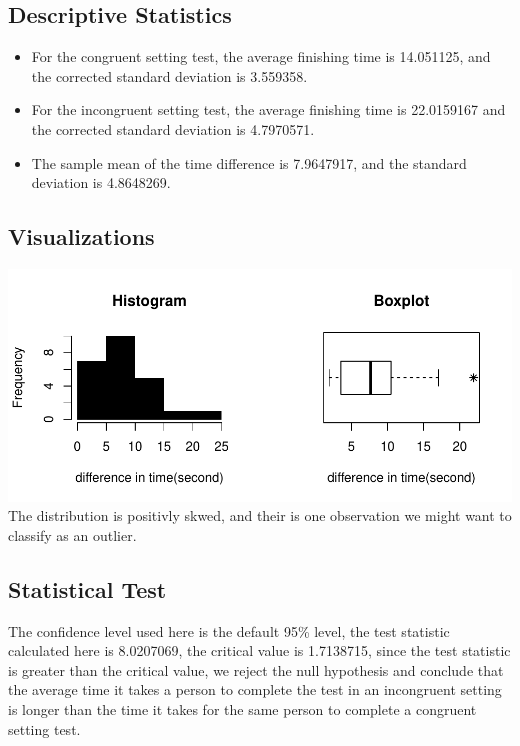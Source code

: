 \documentclass[]{article}
\begin{document}
\subsection{Descriptive Statistics}\label{descriptive-statistics}

\begin{itemize}
\itemsep1pt\parskip0pt
\item
  For the congruent setting test, the average finishing time is
  14.051125, and the corrected standard deviation is 3.559358.\\
\item
  For the incongruent setting test, the average finishing time is
  22.0159167 and the corrected standard deviation is 4.7970571.\\
\item
  The sample mean of the time difference is 7.9647917, and the standard
  deviation is 4.8648269.
\end{itemize}

\subsection{Visualizations}\label{visualizations}

\includegraphics{draft_files/figure-latex/unnamed-chunk-3-1.pdf} The
distribution is positivly skwed, and their is one observation we might
want to classify as an outlier.

\subsection{Statistical Test}\label{statistical-test}

The confidence level used here is the default 95\% level, the test
statistic calculated here is 8.0207069, the critical value is 1.7138715,
since the test statistic is greater than the critical value, we reject
the null hypothesis and conclude that the average time it takes a person
to complete the test in an incongruent setting is longer than the time
it takes for the same person to complete a congruent setting test.
\end{document}
